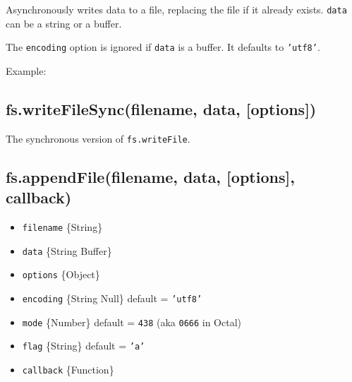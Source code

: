 Asynchronously writes data to a file, replacing the file if it already
exists. \texttt{data} can be a string or a buffer.

The \texttt{encoding} option is ignored if \texttt{data} is a buffer. It
defaults to \texttt{'utf8'}.

Example:

\begin{Shaded}
\begin{Highlighting}[]
\NormalTok{(}\NormalTok{, }\NormalTok{, } 
    
  \NormalTok{(}\NormalTok{);}
\NormalTok{\});}
\end{Highlighting}
\end{Shaded}

\subsection{fs.writeFileSync(filename, data,
{[}options{]})}\label{fs.writefilesyncfilename-data-options}

The synchronous version of \texttt{fs.writeFile}.

\subsection{fs.appendFile(filename, data, {[}options{]},
callback)}\label{fs.appendfilefilename-data-options-callback}

\begin{itemize}
\itemsep1pt\parskip0pt
\item
  \texttt{filename} \{String\}
\item
  \texttt{data} \{String \textbar{} Buffer\}
\item
  \texttt{options} \{Object\}
\item
  \texttt{encoding} \{String \textbar{} Null\} default = \texttt{'utf8'}
\item
  \texttt{mode} \{Number\} default = \texttt{438} (aka \texttt{0666} in
  Octal)
\item
  \texttt{flag} \{String\} default = \texttt{'a'}
\item
  \texttt{callback} \{Function\}
\end{itemize}

